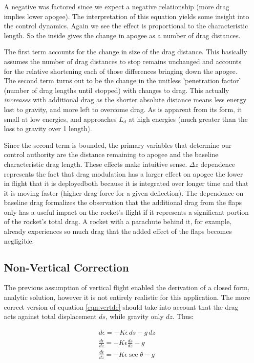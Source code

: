 \documentclass{article}
\begin{document}
	A negative was factored since we expect a negative relationship (more drag implies lower apogee).  The interpretation of this equation yields some insight into the control dynamics.  Again we see the effect is proportional to the characteristic length.  So the inside gives the change in apogee as a number of drag distances.
	
	The first term accounts for the change in size of the drag distance.  This basically assumes the number of drag distances to stop remains unchanged and accounts for the relative shortening each of those differences bringing down the apogee.  The second term turns out to be the change in the unitless 'penetration factor' (number of drag lengths until stopped) with changes to drag.  This actually \textit{increases} with additional drag as the shorter absolute distance means less energy lost to gravity, and more left to overcome drag.  As is apparent from its form, it small at low energies, and approaches $L_d$ at high energies (much greater than the loss to gravity over 1 length).
	
	Since the second term is bounded, the primary variables that determine our control authority are the distance remaining to apogee and the baseline characteristic drag length.  These effects make intuitive sense.  $\Delta z$ dependence represents the fact that drag modulation has a larger effect on apogee the lower in flight that it is deployed\textemdash both because it is integrated over longer time and that it is moving faster (higher drag force for a given deflection).  The dependence on baseline drag formalizes the observation that the additional drag from the flaps only has a useful impact on the rocket's flight if it represents a significant portion of the rocket's total drag.  A rocket with a parachute behind it, for example, already experiences so much drag that the added effect of the flaps becomes negligible.
	
	\subsection{Non-Vertical Correction}
	
	The previous assumption of vertical flight enabled the derivation of a closed form, analytic solution, however it is not entirely realistic for this application.  The more correct version of equation \eqref{eqn:vertde} should take into account that the drag acts against total displacement $ds$, while gravity only $dz$.  Thus:
	
	\begin{eqnarray}
		d\epsilon = -K\epsilon\,ds - g\,dz \\
		\frac{d\epsilon}{dz} = -K\epsilon\frac{ds}{dz} - g \\
		\label{eqn:curvede}\frac{d\epsilon}{dz} = -K\epsilon\sec{\theta} - g
	\end{eqnarray}
	
\end{document}
